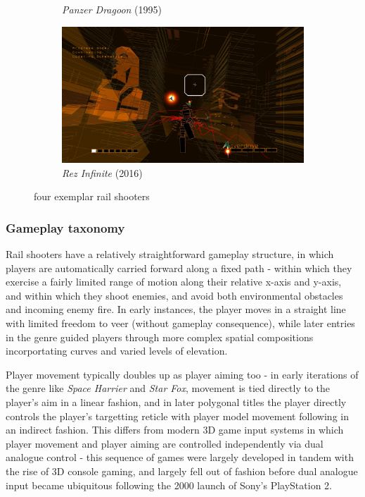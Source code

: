 \documentclass{article}
\begin{document}
\begin{figure}[h]
\begin{subfigure}{.5\textwidth}
  \caption{\textit{Panzer Dragoon} (1995)}
  \label{fig:sfig3}
\end{subfigure}
\begin{subfigure}{.5\textwidth}
  \centering
  \includegraphics[width=.8\linewidth]{rez}
  \caption{\textit{Rez Infinite} (2016)}
  \label{fig:sfig4}
\end{subfigure}
\caption{four exemplar rail shooters}
\label{fig:history}
\end{figure}

\subsubsection*{Gameplay taxonomy}

Rail shooters have a relatively straightforward gameplay structure, in which players are
automatically carried forward along a fixed path - within which they exercise a fairly
limited range of motion along their relative x-axis and y-axis, and within which they
shoot enemies, and avoid both environmental obstacles and incoming enemy fire. In early instances,
the player moves in a straight line with limited freedom to veer (without gameplay consequence),
while later entries in the genre guided players through more complex spatial compositions incorportating
curves and varied levels of elevation.

Player movement typically doubles up as player aiming too - in early iterations of the genre like
\textit{Space Harrier} and \textit{Star Fox}, movement is tied directly to the player's aim in a
linear fashion, and in later polygonal titles the player directly controls the player's targetting
reticle with player model movement following in an indirect fashion. This differs from modern 3D
game input systems in which player movement and player aiming are controlled independently via dual 
analogue control - this sequence of games were largely developed in tandem with the rise of 3D console
gaming, and largely fell out of fashion before dual analogue input became ubiquitous following the
2000 launch of Sony's PlayStation 2.
\end{document}
